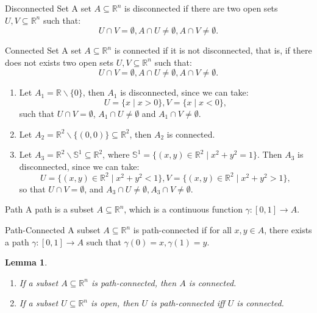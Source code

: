 \documentclass[11pt]{article}
\makeatletter
\newcounter{thmcounter}
\newenvironment{definition}[1]{\begin{defbox}{#1}{}}{\end{defbox}}
\newenvironment{example}[1]{\begin{exbox}{#1}{}}{\end{exbox}}
\theoremstyle{quiet}
\newtheorem{lemma}[thmcounter]{Lemma}
\newtheorem{lemma}[tcb@cnt@defbox]{Lemma}
\theoremstyle{quietremark}
\makeatother
\begin{document}
\begin{definition}{Disconnected Set}
A set $A\subseteq\mathbb{R}^n$ is disconnected if there are two open sets $U,V\subseteq\mathbb{R}^n$ such that: 
\[
U\cap V=\emptyset, A\cap U\ne\emptyset, A\cap V\ne\emptyset.
\]
\end{definition}

\begin{definition}{Connected Set}
A set $A\subseteq\mathbb{R}^n$ is connected if it is not disconnected, that is, if there does not exists two open sets $U,V\subseteq\mathbb{R}^n$ such that: 
\[
U\cap V=\emptyset,A\cap U\ne\emptyset,A\cap V\ne\emptyset.
\]
\end{definition}

\begin{example}{}
\begin{enumerate}
\item Let $A_1=\mathbb{R}\backslash{\{0\}}$, then $A_1$ is disconnected, since we can take: 
\[
U=\{x\mid x>0\},V=\{x\mid x<0\},
\]
such that $U\cap V=\emptyset$, $A_1\cap U\ne\emptyset$ and $A_1\cap V\ne\emptyset$.
\item Let $A_2=\mathbb{R}^2\backslash\{(0,0)\}\subseteq\mathbb{R}^2$, then $A_2$ is connected.
\item Let $A_3=\mathbb{R}^2\backslash\mathbb{S}^1\subseteq\mathbb{R}^2$, where $\mathbb{S}^1=\{(x,y)\in\mathbb{R}^2\mid x^2+y^2=1\}.$ Then $A_3$ is disconnected, since we can take: 
\[
U=\{(x,y)\in\mathbb{R}^2\mid x^2+y^2<1\},V=\{(x,y)\in\mathbb{R}^2\mid x^2+y^2>1\},
\]
so that $U\cap V=\emptyset$, and $A_3\cap U\ne\emptyset, A_3\cap V\ne\emptyset.$
\end{enumerate}
\end{example}

\begin{definition}{Path}
A path is a subset $A\subseteq\mathbb{R}^n$, which is a continuous function $\gamma:[0,1]\to A$.
\end{definition}

\begin{definition}{Path-Connected}
A subset $A\subseteq\mathbb{R}^n$ is path-connected if for all $x,y\in A$, there exists a path $\gamma:[0,1]\to A$ such that $\gamma(0)=x, \gamma(1)=y$.
\end{definition}

\begin{lemma}
\begin{enumerate}
\item If a subset $A\subseteq\mathbb{R}^n$ is path-connected, then $A$ is connected.
\item If a subset $U\subseteq\mathbb{R}^n$ is open, then $U$ is path-connected iff $U$ is connected.
\end{enumerate} 
\end{lemma}
\end{document}
